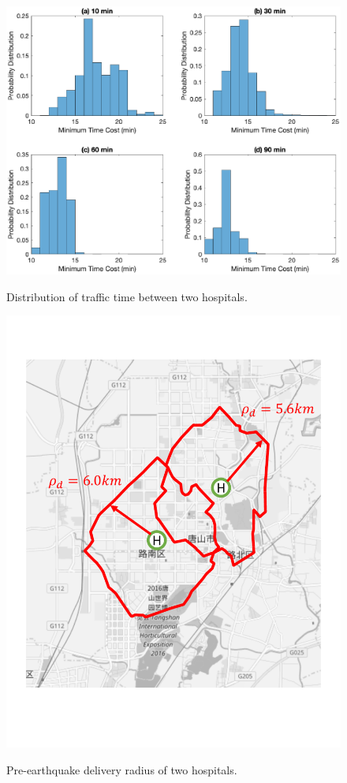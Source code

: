 \documentclass[review,11pt,nonatbib]{elsarticle}
\begin{document}
\begin{figure}[!htp]\centering
\includegraphics[width = 15cm]{hospital_path.eps}\\
\caption{Distribution of traffic time between two hospitals.}\label{fig6}
\end{figure}

\begin{figure}[!htp]\centering
\includegraphics[width=12cm]{initial_contour.pdf}\\
\caption{Pre-earthquake delivery radius of two hospitals.}\label{fig7}
\end{figure}
\end{document}
